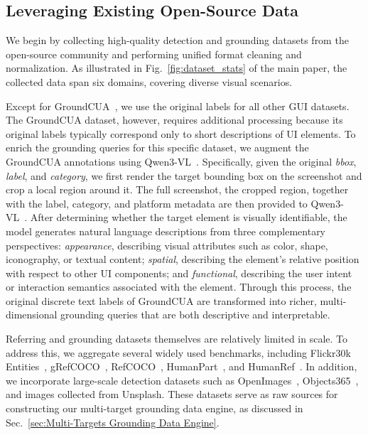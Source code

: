 \documentclass{llmxive}
\begin{document}
\subsection{Leveraging Existing Open-Source Data}
We begin by collecting high-quality detection and grounding datasets from the open-source community and performing unified format cleaning and normalization. As illustrated in Fig.~\ref{fig:dataset_stats} of the main paper, the collected data span six domains, covering diverse visual scenarios.

Except for GroundCUA~\citep{feizi2025grounding}, we use the original labels for all other GUI datasets. The GroundCUA dataset, however, requires additional processing because its original labels typically correspond only to short descriptions of UI elements. To enrich the grounding queries for this specific dataset, we augment the GroundCUA annotations using Qwen3-VL~\citep{bai2025qwen3vltechnicalreport}. Specifically, given the original \textit{bbox}, \textit{label}, and \textit{category}, we first render the target bounding box on the screenshot and crop a local region around it. The full screenshot, the cropped region, together with the label, category, and platform metadata are then provided to Qwen3-VL~\citep{bai2025qwen3vltechnicalreport}. After determining whether the target element is visually identifiable, the model generates natural language descriptions from three complementary perspectives: \textit{appearance}, describing visual attributes such as color, shape, iconography, or textual content; \textit{spatial}, describing the element's relative position with respect to other UI components; and \textit{functional}, describing the user intent or interaction semantics associated with the element. Through this process, the original discrete text labels of GroundCUA are transformed into richer, multi-dimensional grounding queries that are both descriptive and interpretable.

Referring and grounding datasets themselves are relatively limited in scale. To address this, we aggregate several widely used benchmarks, including Flickr30k Entities~\citep{plummer2016flickr30kentitiescollectingregiontophrase}, gRefCOCO~\citep{he2023grecgeneralizedreferringexpression}, RefCOCO~\citep{yu2016modelingcontextreferringexpressions}, HumanPart~\citep{yu2016modelingcontextreferringexpressions}, and HumanRef~\citep{jiang2025rexomni}. In addition, we incorporate large-scale detection datasets such as OpenImages~\citep{kuznetsova2020open}, Objects365~\citep{Shao_2019_ICCV}, and images collected from Unsplash. These datasets serve as raw sources for constructing our multi-target grounding data engine, as discussed in Sec.~\ref{sec:Multi-Targets Grounding Data Engine}.
\end{document}
